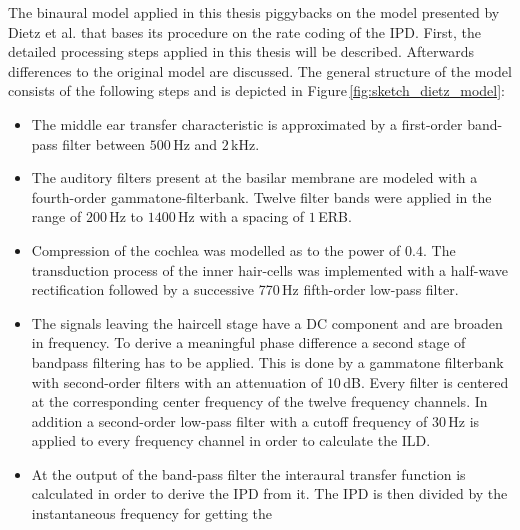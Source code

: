 The binaural model applied in this thesis piggybacks on the model presented by
Dietz et al.\autocite{Dietz2011} that bases its procedure on the rate coding of
the \ac{IPD}. First, the detailed processing steps applied in this thesis will be
described. Afterwards differences to the original model are discussed. The general
structure of the model consists of the following steps and is depicted in
Figure\,\ref{fig:sketch_dietz_model}:
\begin{itemize}
    \item The middle ear transfer characteristic is approximated by a
        first-order band-pass filter between $500$\,Hz and
        $2$\,kHz.\autocite{Puria2003}
    \item The auditory filters present at the basilar membrane are modeled with
        a fourth-order gammatone-filterbank.\autocite{Hohmann2002}
        Twelve filter bands were applied in the range of $200$\,Hz to $1400$\,Hz
        with a spacing of $1$\,ERB.
    \item Compression of the cochlea was
        modelled as to the power of $0.4$.\autocite{Ewert2000,Ruggero1997}
        The transduction process of the inner
        hair-cells was implemented with a half-wave rectification followed by a
        successive 770\,Hz fifth-order low-pass filter.\autocite{Breebaart2001}
    \item The signals leaving the haircell stage have a DC component and are
        broaden in frequency. To derive a meaningful phase difference a second
        stage of bandpass filtering has to be applied. This is done by a
        gammatone filterbank with second-order filters with an attenuation of
        $10$\,dB. Every filter is centered at the corresponding center frequency
        of the twelve frequency channels. In addition a second-order low-pass
        filter with a cutoff frequency of $30$\,Hz is applied to every frequency
        channel in order to calculate the \ac{ILD}.
    \item At the output of the band-pass filter the interaural transfer function
        is calculated in order to derive the \ac{IPD} from it. The
        \ac{IPD} is then divided by the instantaneous frequency for getting the

\end{itemize}
